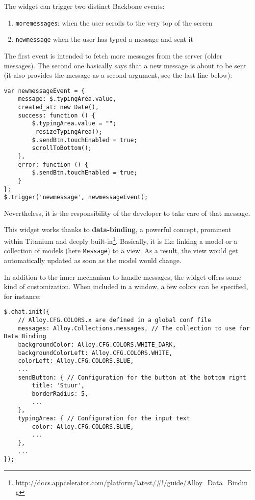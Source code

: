 \medskip

The widget can trigger two distinct Backbone events:

\begin{enumerate}
  \item \lstinline{moremessages}: when the user scrolls to the very top of the screen
  \item \lstinline{newmessage} when the user has typed a message and sent it
\end{enumerate}

The first event is intended to fetch more messages from the server (older messages). The second one basically says that a new message is about to be sent (it also provides the message as a second argument, see the last line below):

\javascript
\begin{lstlisting}
var newmessageEvent = {
    message: $.typingArea.value,
    created_at: new Date(),
    success: function () {
        $.typingArea.value = "";
        _resizeTypingArea();
        $.sendBtn.touchEnabled = true;
        scrollToBottom();
    },
    error: function () {
        $.sendBtn.touchEnabled = true;
    }
};
$.trigger('newmessage', newmessageEvent);
\end{lstlisting}
Nevertheless, it is the responsibility of the developer to take care of that message.

\medskip

This widget works thanks to \textbf{data-binding}, a powerful concept, prominent within Titanium and deeply built-in\footnote{\href{http://docs.appcelerator.com/platform/latest/\#!/guide/Alloy_Data_Binding}{http://docs.appcelerator.com/platform/latest/\#!/guide/Alloy\_Data\_Binding}}. Basically, it is like linking a model or a collection of models (here \lstinline{Message}) to a view. As a result, the view would get automatically updated as soon as the model would change.

\medskip

In addition to the inner mechanism to handle messages, the widget offers some kind of customization. When included in a window, a few colors can be specified, for instance:

\begin{lstlisting}
$.chat.init({
    // Alloy.CFG.COLORS.x are defined in a global conf file
    messages: Alloy.Collections.messages, // The collection to use for Data Binding
    backgroundColor: Alloy.CFG.COLORS.WHITE_DARK,
    backgroundColorLeft: Alloy.CFG.COLORS.WHITE,
    colorLeft: Alloy.CFG.COLORS.BLUE,
    ...
    sendButton: { // Configuration for the button at the bottom right
        title: 'Stuur',
        borderRadius: 5,
        ...
    },
    typingArea: { // Configuration for the input text
        color: Alloy.CFG.COLORS.BLUE,
        ...
    },
    ...
});
\end{lstlisting}


